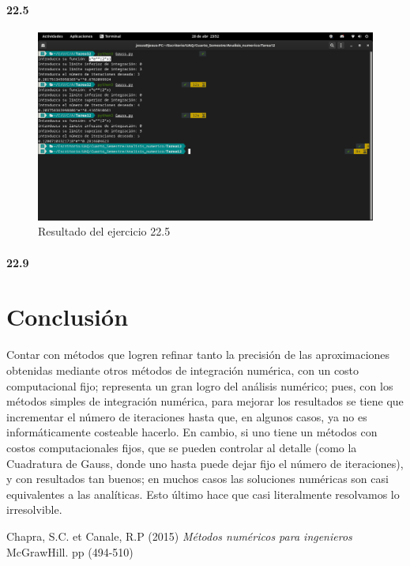 \documentclass[12pt,oneside,FLEQN]{report}
\begin{document}
{		\subsubsection{22.5}
		\begin{figure}[!h]
			\centering
			\includegraphics[scale=0.3]{225.png}
			\caption{Resultado del ejercicio 22.5}
		\end{figure}
		\subsubsection{22.9}
\chapter{Conclusión}
Contar con métodos que logren refinar tanto la precisión de las aproximaciones obtenidas mediante otros métodos de integración numérica, con un costo computacional fijo; representa un gran logro del análisis numérico; pues, con los métodos simples de integración numérica, para mejorar los resultados se tiene que incrementar el número de iteraciones hasta que, en algunos casos, ya no es informáticamente costeable hacerlo. En cambio, si uno tiene un métodos con costos computacionales fijos, que se pueden controlar al detalle (como la Cuadratura de Gauss, donde uno hasta puede dejar fijo el número de iteraciones), y con resultados tan buenos; en muchos casos las soluciones numéricas son casi equivalentes a las analíticas. Esto último hace que casi literalmente resolvamos lo irresolvible. 
\begin{thebibliography}{1}
	 Chapra, S.C. et Canale, R.P (2015) {\it Métodos numéricos para ingenieros} McGrawHill. pp (494-510)

\end{thebibliography}
}
\end{document}
